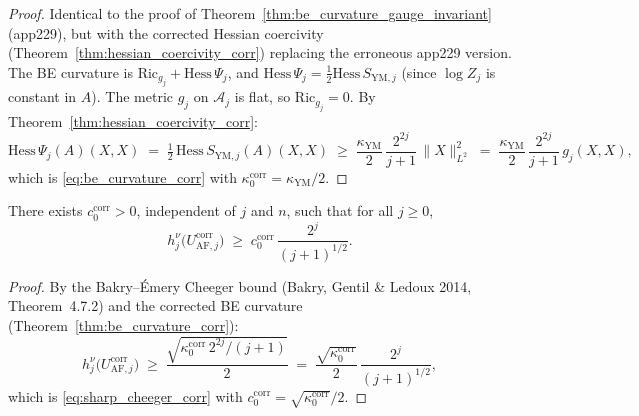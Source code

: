 \begin{proof}
Identical to the proof of
Theorem~\ref{thm:be_curvature_gauge_invariant} (app229), but with
the corrected Hessian coercivity
(Theorem~\ref{thm:hessian_coercivity_corr}) replacing the
erroneous app229 version. The BE curvature is
$\mathrm{Ric}_{g_{j}}+\mathrm{Hess}\,\Psi_{j}$, and
$\mathrm{Hess}\,\Psi_{j}=\tfrac{1}{2}\mathrm{Hess}\,S_{\mathrm{YM},j}$
(since $\log Z_{j}$ is constant in $A$). The metric
$g_{j}$ on $\mathcal{A}_{j}$ is flat, so $\mathrm{Ric}_{g_{j}}=0$.
By Theorem~\ref{thm:hessian_coercivity_corr}:
\begin{equation*}
  \mathrm{Hess}\,\Psi_{j}(A)(X,X)
  \;=\;\tfrac{1}{2}\,\mathrm{Hess}\,S_{\mathrm{YM},j}(A)(X,X)
  \;\ge\;\frac{\kappa_{\mathrm{YM}}}{2}\,\frac{2^{2j}}{j+1}\,
  \|X\|_{L^{2}}^{2}
  \;=\;\frac{\kappa_{\mathrm{YM}}}{2}\,\frac{2^{2j}}{j+1}\,
  g_{j}(X,X),
\end{equation*}
which is \eqref{eq:be_curvature_corr} with
$\kappa_{0}^{\mathrm{corr}}=\kappa_{\mathrm{YM}}/2$.
\end{proof}

\begin{theorem}
\label{thm:sharp_cheeger_corr}
There exists $c_{0}^{\mathrm{corr}}>0$, independent of $j$ and
$n$, such that for all $j\ge 0$,
\begin{equation}
\label{eq:sharp_cheeger_corr}
  h_{j}^{\nu}\bigl(U_{\mathrm{AF},j}^{\mathrm{corr}}\bigr)
  \;\ge\;c_{0}^{\mathrm{corr}}\,\frac{2^{j}}{(j+1)^{1/2}}.
\end{equation}
\end{theorem}

\begin{proof}
By the Bakry--\'Emery Cheeger bound
(Bakry, Gentil \& Ledoux 2014, Theorem~4.7.2) and the corrected
BE curvature (Theorem~\ref{thm:be_curvature_corr}):
\begin{equation*}
  h_{j}^{\nu}\bigl(U_{\mathrm{AF},j}^{\mathrm{corr}}\bigr)
  \;\ge\;\frac{\sqrt{\kappa_{0}^{\mathrm{corr}}\,2^{2j}/(j+1)}}{2}
  \;=\;\frac{\sqrt{\kappa_{0}^{\mathrm{corr}}}}{2}\,
  \frac{2^{j}}{(j+1)^{1/2}},
\end{equation*}
which is \eqref{eq:sharp_cheeger_corr} with
$c_{0}^{\mathrm{corr}}=\sqrt{\kappa_{0}^{\mathrm{corr}}}/2$.
\end{proof}

